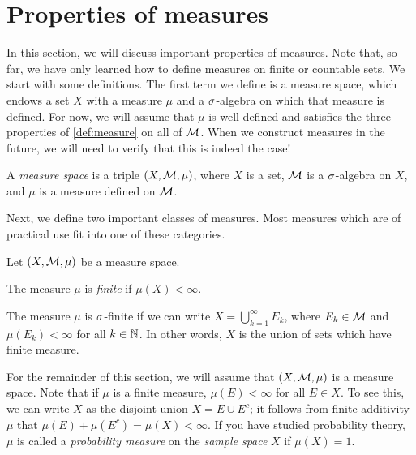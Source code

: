 \documentclass[main.tex]{subfiles}
\begin{document}
\section{Properties of measures}

In this section, we will discuss important properties of measures. Note that, so far, we have only learned how to define measures on finite or countable sets. We start with some definitions. The first term we define is a measure space, which endows a set $X$ with a measure $\mu$ and a ${\sigma}$-algebra on which that measure is defined. For now, we will assume that $\mu$ is well-defined and satisfies the three properties of \cref{def:measure} on all of ${\mathcal M}$. When we construct measures in the future, we will need to verify that this is indeed the case!

\begin{definition}\label{def:measurespace}
A \emph{measure space} is a triple $(X, {\mathcal M}, \mu)$, where $X$ is a set, ${\mathcal M}$ is a ${\sigma}$-algebra on $X$, and $\mu$ is a measure defined on ${\mathcal M}$. 
\end{definition}

Next, we define two important classes of measures. Most measures which are of practical use fit into one of these categories. 

\begin{definition}\label{def:sfinitemeasure}
Let $(X, {\mathcal M}, \mu)$ be a measure space.
\begin{romannum}
\item The measure $\mu$ is \emph{finite} if $\mu(X) < \infty$.
\item The measure $\mu$ is ${\sigma}$-finite if we can write $X = \bigcup_{k=1}^\infty E_k$, where $E_k \in {\mathcal M}$ and $\mu(E_k) < \infty$ for all $k \in {\mathbb N}$. In other words, $X$ is the union of sets which have finite measure.
\end{romannum}
\end{definition}

For the remainder of this section, we will assume that $(X, {\mathcal M}, \mu)$ is a measure space. Note that if $\mu$ is a finite measure, $\mu(E) < \infty$ for all $E \in X$. To see this, we can write $X$ as the disjoint union $X = E \cup E^c$; it follows from finite additivity $\mu$ that $\mu(E) + \mu(E^c) = \mu(X) < \infty$. If you have studied probability theory, $\mu$ is called a \emph{probability measure} on the \emph{sample space} $X$ if $\mu(X) = 1$.
\end{document}
